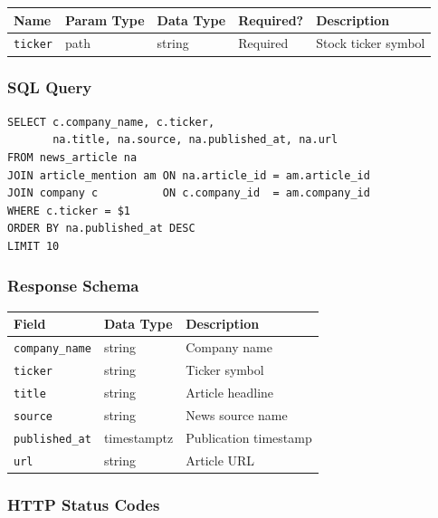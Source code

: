 \documentclass[11pt]{article}
\begin{document}
\begin{center}
\small
\begin{tabular}{l l l l p{5cm}}
\toprule
\textbf{Name} & \textbf{Param Type} & \textbf{Data Type} & \textbf{Required?} & \textbf{Description} \\
\midrule
\texttt{ticker} & path & string & Required & Stock ticker symbol \\
\bottomrule
\end{tabular}
\end{center}

\subsubsection*{SQL Query}
\begin{lstlisting}[style=sql,basicstyle=\ttfamily\scriptsize]
SELECT c.company_name, c.ticker,
       na.title, na.source, na.published_at, na.url
FROM news_article na
JOIN article_mention am ON na.article_id = am.article_id
JOIN company c          ON c.company_id  = am.company_id
WHERE c.ticker = $1
ORDER BY na.published_at DESC
LIMIT 10
\end{lstlisting}

\subsubsection*{Response Schema}

\begin{center}
\small
\begin{tabular}{l l p{7cm}}
\toprule
\textbf{Field} & \textbf{Data Type} & \textbf{Description} \\
\midrule
\texttt{company\_name} & string      & Company name \\
\texttt{ticker}        & string      & Ticker symbol \\
\texttt{title}         & string      & Article headline \\
\texttt{source}        & string      & News source name \\
\texttt{published\_at} & timestamptz & Publication timestamp \\
\texttt{url}           & string      & Article URL \\
\bottomrule
\end{tabular}
\end{center}

\subsubsection*{HTTP Status Codes}
\end{document}
